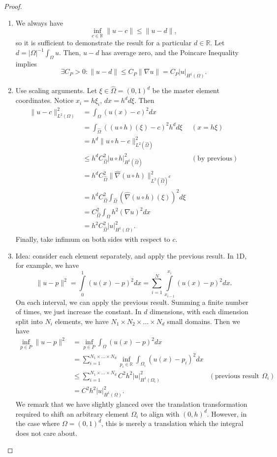 \documentclass[letterpaper,twoside,11pt]{article}
\theoremstyle{mystyle}
\newcommand{\R}{{\mathbb R}}
\newcommand{\cblu}{\color{blue}}
\newcommand{\inv}{^{-1}}
\newcommand{\Hone}{H^1\left( \Omega \right)}
\begin{document}
\cblu 
\begin{proof}
  \begin{enumerate}
    \item We always have 
    \[\inf_{c\in \R} \|u-c\| \leq \| u - d \|,  \]
    so it is sufficient to demonstrate the result for a particular $d\in \R$. Let $d = |\Omega|\inv \int_\Omega u$. Then, $u-d$ has average zero, and the Poincare Inequality implies 
    \[\exists C_P>0 : \|u-d\| \leq C_P \|\nabla u\| = C_P |u|_{\Hone}.\]
    \item Use scaling arguments. Let $\xi\in \hat \Omega = \left( 0,1 \right)^d$ be the master element coordinates. Notice $x_i = h\xi_i$, $dx = h^d d\xi$. Then 
    \begin{align*}
      \|u-c\|^2_{L^2(\Omega)} &= \int_\Omega (u(x)-c)^2 dx \\[.2cm] 
      &= \int_{\hat \Omega} \left( (u\circ h)(\xi) - c \right)^2 h^d d\xi &  (x = h \xi)  \\[.2cm]
      &= h^d\|u \circ h - c \|^2_{L^2 (\hat \Omega)} \\[.2cm] 
      &\leq h^dC_{\hat\Omega}^2 |u\circ h|^2_{H^1(\hat\Omega)} & (\text{by previous})\\[.2cm] 
      &= h^dC_{\hat\Omega}^2 \|\hat \nabla (u\circ h) \|^2_{L^2(\hat \Omega)^d} \\[.2cm]
      &= h^dC_{\hat\Omega}^2 \int_{\hat\Omega} (\hat \nabla (u \circ h) (\xi))^2 d\xi \\[.2cm]
      &= C_{\hat\Omega}^2 \int_\Omega h^2 \left( \nabla u \right)^2 dx \\[.2cm]
      &= h^2 C_{\hat\Omega}^2 |u|^2_{\Hone}.
    \end{align*}
    Finally, take infimum on both sides with respect to $c$. 
    \item Idea: consider each element separately, and apply the previous result. In 1D, for example, we have
    \[\|u-p\|^2=\int\limits_0^1 (u(x)-p)^2 dx = \sum_{i = 1}^{N}\int\limits_{x_{i-1}}^{x_i} (u(x)-p)^2dx.\]
    On each interval, we can apply the previous result. Summing a finite number of times, we just increase the constant. In $d$ dimensions, with each dimension split into $N_i$ elements, we have \(N_1 \times N_2 \times \dots \times N_d \) small domains. Then we have 
    \begin{align*}
      \inf_{p\in P}\|u-p\|^2 &= \inf_{p\in P}\int_\Omega (u(x)-p)^2 dx \\[.2cm]
      &=\sum_{i = 1}^{N_1 \times \dots \times N_d} \inf_{p_i\in \R}\int_{\Omega_i} (u(x)-p_i)^2 dx \\[.2cm]
      &\leq \sum_{i = 1}^{N_1 \times \dots \times N_d} C^2h^2 |u|^2_{H^1(\Omega_i)} & (\text{previous result on } \Omega_i)\\[.2cm]
      &= C^2 h^2 |u|^2_{H^1(\Omega)}.
    \end{align*}
    We remark that we have slightly glanced over the translation transformation required to shift an arbitrary element \(\Omega_i\) to align with \(\left( 0,h \right)^d\). However, in the case where \(\Omega = \left( 0,1 \right)^d\), this is merely a translation which the integral does not care about. 
  \end{enumerate}
\end{proof}
\end{document}
